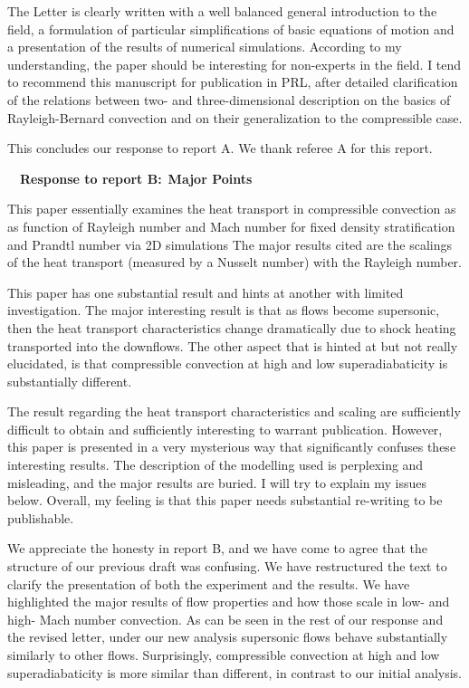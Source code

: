 \documentclass[aps, 11pt, singlecolumn]{revtex4-1} %
\begin{document}
\begin{singlespace}
\begin{myquotation}
The Letter is clearly written with a well balanced general
introduction to the field, a formulation of particular simplifications
of basic equations of motion and a presentation of the results of
numerical simulations. According to my understanding, the paper should
be interesting for non-experts in the field. I tend to recommend this
manuscript for publication in PRL, after detailed clarification of the
relations between two- and three-dimensional description on the basics
of Rayleigh-Bernard convection and on their generalization to the
compressible case.
\end{myquotation}

This concludes our response to report A.  We thank referee A for this report.




$\,$
\newline
$\,$
\newline
\noindent
\Large{\textbf{Response to report B:}}\newline$\,$\newline\indent
\large{\textbf{Major Points}}

\begin{myquotation}
This paper essentially examines the heat transport in compressible
convection as as function of Rayleigh number and Mach number for fixed
density stratification and Prandtl number via 2D simulations The major
results cited are the scalings of the heat transport (measured by a
Nusselt number) with the Rayleigh number.

This paper has one substantial result and hints at another with
limited investigation. The major interesting result is that as flows
become supersonic, then the heat transport characteristics change
dramatically due to shock heating transported into the downflows. The
other aspect that is hinted at but not really elucidated, is that
compressible convection at high and low superadiabaticity is
substantially different.

The result regarding the heat transport characteristics and scaling
are sufficiently difficult to obtain and sufficiently interesting to
warrant publication. However, this paper is presented in a very
mysterious way that significantly confuses these interesting results.
The description of the modelling used is perplexing and misleading,
and the major results are buried. I will try to explain my issues
below. Overall, my feeling is that this paper needs substantial
re-writing to be publishable.
\end{myquotation}
We appreciate the honesty in report B, and we have come to agree that the
structure of our previous draft was confusing.  We have restructured the text
to clarify the presentation of both the experiment and the results. 
We have highlighted the major results of flow properties and how those
scale in low- and high- Mach number convection.  As can be seen in
the rest of our response and the revised letter, under our new analysis
supersonic flows behave substantially similarly to other flows.  Surprisingly,
compressible convection at high and low superadiabaticity is more similar
than different, in contrast to our initial analysis.


\end{singlespace}
\end{document}
